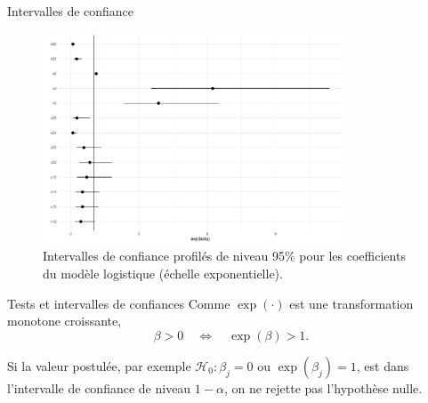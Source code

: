 \documentclass[
  ignorenonframetext,
]{beamer}
\begin{document}
\begin{frame}{Intervalles de confiance}
\protect\hypertarget{intervalles-de-confiance}{}
\begin{figure}

{\centering \includegraphics[width=0.8\textwidth,height=\textheight]{MATH60602-diapos5_files/figure-beamer/fig-confint-modele2-logist-1.pdf}

}

\caption{\label{fig-confint-modele2-logist}Intervalles de confiance
profilés de niveau 95\% pour les coefficients du modèle logistique
(échelle exponentielle).}

\end{figure}
\end{frame}

\begin{frame}{Tests et intervalles de confiances}
\protect\hypertarget{tests-et-intervalles-de-confiances}{}
Comme \(\exp(\cdot)\) est une transformation monotone croissante,
\[\beta>0 \quad \iff \quad \exp(\beta)>1.\]

Si la valeur postulée, par exemple \(\mathscr{H}_0: \beta_j=0\) ou
\(\exp(\beta_j)=1\), est dans l'intervalle de confiance de niveau
\(1-\alpha\), on ne rejette pas l'hypothèse nulle.
\end{frame}
\end{document}
